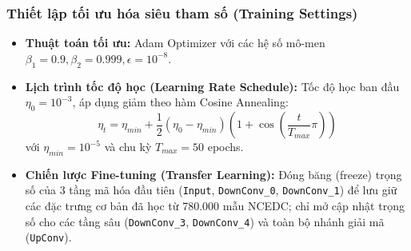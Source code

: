 \documentclass[preprint,1p]{elsarticle}
\begin{document}
\subsubsection{Thiết lập tối ưu hóa siêu tham số (Training Settings)}
\begin{itemize}
    \item \textbf{Thuật toán tối ưu:} Adam Optimizer \cite{kingma2014adam} với các hệ số mô-men $\beta_1 = 0.9, \beta_2 = 0.999, \epsilon = 10^{-8}$.
    \item \textbf{Lịch trình tốc độ học (Learning Rate Schedule):} Tốc độ học ban đầu $\eta_0 = 10^{-3}$, áp dụng giảm theo hàm Cosine Annealing:
    \begin{equation}
    \eta_t = \eta_{min} + \frac{1}{2}(\eta_0 - \eta_{min})\left(1 + \cos\left(\frac{t}{T_{max}}\pi\right)\right)
    \label{eq:cosine_lr}
    \end{equation}
    với $\eta_{min} = 10^{-5}$ và chu kỳ $T_{max} = 50$ epochs.
    \item \textbf{Chiến lược Fine-tuning (Transfer Learning):} Đóng băng (freeze) trọng số của 3 tầng mã hóa đầu tiên (\texttt{Input}, \texttt{DownConv\_0}, \texttt{DownConv\_1}) để lưu giữ các đặc trưng cơ bản đã học từ 780.000 mẫu NCEDC; chỉ mở cập nhật trọng số cho các tầng sâu (\texttt{DownConv\_3}, \texttt{DownConv\_4}) và toàn bộ nhánh giải mã (\texttt{UpConv}).
\end{itemize}
\end{document}
